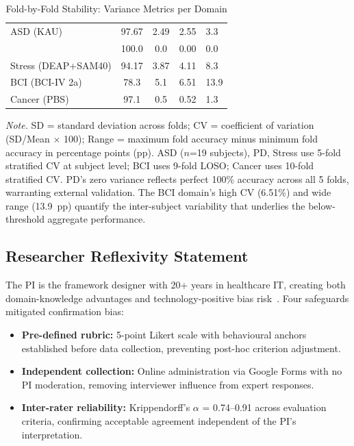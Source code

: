\begin{table}[!htbp]
\tablefontsize
\caption{Fold-by-Fold Stability: Variance Metrics per Domain}
\begin{tabularx}{\textwidth}{@{} l C C C L @{}}
\toprule
{} &  &  &  &  \\
\midrule
ASD (KAU) & 97.67 & 2.49 & 2.55 & 3.3 \\
& 100.0 & 0.0 & 0.00 & 0.0 \\
Stress (DEAP+SAM40) & 94.17 & 3.87 & 4.11 & 8.3 \\
BCI (BCI-IV 2a) & 78.3 & 5.1 & 6.51 & 13.9 \\
Cancer (PBS) & 97.1 & 0.5 & 0.52 & 1.3 \\
\bottomrule
\end{tabularx}
\vspace{0.5em}\noindent\textit{Note.} SD = standard deviation across folds; CV = coefficient of variation (SD/Mean $\times$ 100); Range = maximum fold accuracy minus minimum fold accuracy in percentage points (pp). ASD ($n$=19 subjects), PD, Stress use 5-fold stratified CV at subject level; BCI uses 9-fold LOSO; Cancer uses 10-fold stratified CV. PD's zero variance reflects perfect 100\% accuracy across all 5 folds, warranting external validation. The BCI domain's high CV (6.51\%) and wide range (13.9~pp) quantify the inter-subject variability that underlies the below-threshold aggregate performance.
\end{table}
\fi %

\subsection{Researcher Reflexivity Statement}

The PI is the framework designer with 20+ years in healthcare IT, creating both domain-knowledge advantages and technology-positive bias risk~\cite{lincoln1985naturalistic}. Four safeguards mitigated confirmation bias:

\begin{itemize}[leftmargin=*, itemsep=3pt]
    \item \textbf{Pre-defined rubric:} 5-point Likert scale with behavioural anchors established before data collection, preventing post-hoc criterion adjustment.
    \item \textbf{Independent collection:} Online administration via Google Forms with no PI moderation, removing interviewer influence from expert responses.
    \item \textbf{Inter-rater reliability:} Krippendorff's $\alpha$ = 0.74--0.91 across evaluation criteria, confirming acceptable agreement independent of the PI's interpretation.
\end{itemize}

